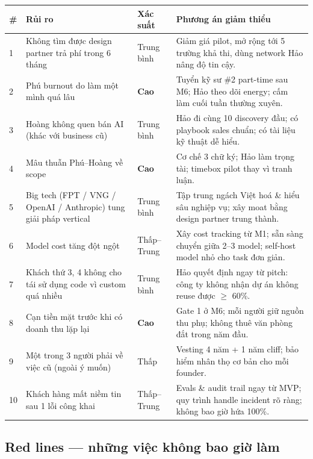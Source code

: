 \documentclass[11pt,a4paper]{article}
\begin{document}
\begin{tabularx}{\linewidth}{@{}p{0.5cm} p{3.3cm} X X@{}}
\toprule
\textbf{\#} & \textbf{Rủi ro} & \textbf{Xác suất} & \textbf{Phương án giảm thiểu} \\
\midrule
1 & Không tìm được design partner trả phí trong 6 tháng & Trung bình & Giảm giá pilot, mở rộng tới 5 trường khả thi, dùng network Hảo nâng độ tin cậy. \\
2 & Phú burnout do làm một mình quá lâu & \textbf{Cao} & Tuyển kỹ sư \#2 part-time sau M6; Hảo theo dõi energy; cấm làm cuối tuần thường xuyên. \\
3 & Hoàng không quen bán AI (khác với business cũ) & Trung bình & Hảo đi cùng 10 discovery đầu; có playbook sales chuẩn; có tài liệu kỹ thuật dễ hiểu. \\
4 & Mâu thuẫn Phú--Hoàng về scope & \textbf{Cao} & Cơ chế 3 chữ ký; Hảo làm trọng tài; timebox pilot thay vì tranh luận. \\
5 & Big tech (FPT / VNG / OpenAI / Anthropic) tung giải pháp vertical & Trung bình & Tập trung ngách Việt hoá \& hiểu sâu nghiệp vụ; xây moat bằng design partner trung thành. \\
6 & Model cost tăng đột ngột & Thấp--Trung & Xây cost tracking từ M1; sẵn sàng chuyển giữa 2--3 model; self-host model nhỏ cho task đơn giản. \\
7 & Khách thứ 3, 4 không cho tái sử dụng code vì custom quá nhiều & Trung bình & Hảo quyết định ngay từ pitch: công ty không nhận dự án không reuse được $\geq$ 60\%. \\
8 & Cạn tiền mặt trước khi có doanh thu lặp lại & \textbf{Cao} & Gate 1 ở M6; mỗi người giữ nguồn thu phụ; không thuê văn phòng đắt trong năm đầu. \\
9 & Một trong 3 người phải về việc cũ (ngoài ý muốn) & Thấp & Vesting 4 năm + 1 năm cliff; bảo hiểm nhân thọ cơ bản cho mỗi founder. \\
10 & Khách hàng mất niềm tin sau 1 lỗi công khai & Thấp--Trung & Evals \& audit trail ngay từ MVP; quy trình handle incident rõ ràng; không bao giờ hứa 100\%. \\
\bottomrule
\end{tabularx}

\subsection{Red lines --- những việc không bao giờ làm}
\end{document}
